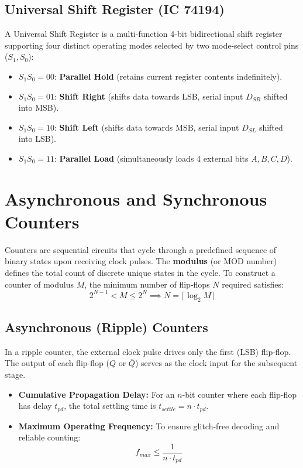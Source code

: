 \subsection{Universal Shift Register (IC 74194)}
A Universal Shift Register is a multi-function 4-bit bidirectional shift register supporting four distinct operating modes selected by two mode-select control pins ($S_1, S_0$):
\begin{itemize}
    \item $S_1 S_0 = 00$: \textbf{Parallel Hold} (retains current register contents indefinitely).
    \item $S_1 S_0 = 01$: \textbf{Shift Right} (shifts data towards LSB, serial input $D_{SR}$ shifted into MSB).
    \item $S_1 S_0 = 10$: \textbf{Shift Left} (shifts data towards MSB, serial input $D_{SL}$ shifted into LSB).
    \item $S_1 S_0 = 11$: \textbf{Parallel Load} (simultaneously loads 4 external bits $A, B, C, D$).
\end{itemize}

\section{Asynchronous and Synchronous Counters}
Counters are sequential circuits that cycle through a predefined sequence of binary states upon receiving clock pulses. The \textbf{modulus} (or MOD number) defines the total count of discrete unique states in the cycle. To construct a counter of modulus $M$, the minimum number of flip-flops $N$ required satisfies:
\begin{equation}
2^{N-1} < M \le 2^N \implies N = \lceil \log_2 M \rceil
\end{equation}

\subsection{Asynchronous (Ripple) Counters}
In a ripple counter, the external clock pulse drives only the first (LSB) flip-flop. The output of each flip-flop ($Q$ or $\overline{Q}$) serves as the clock input for the subsequent stage.
\begin{itemize}
    \item \textbf{Cumulative Propagation Delay:} For an $n$-bit counter where each flip-flop has delay $t_{pd}$, the total settling time is $t_{settle} = n \cdot t_{pd}$.
    \item \textbf{Maximum Operating Frequency:} To ensure glitch-free decoding and reliable counting:
    \begin{equation}
    f_{max} \le \frac{1}{n \cdot t_{pd}}
    \end{equation}
\end{itemize}

